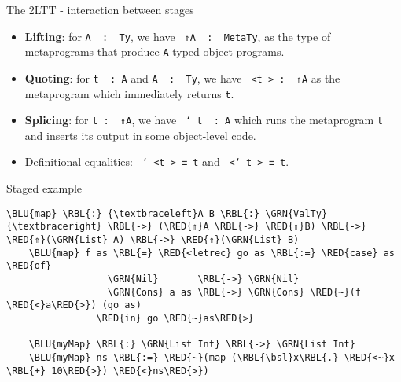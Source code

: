 \documentclass[dvipsnames,aspectratio=169]{beamer}
\newcommand{\ttt}[1]{{\texttt{#1}}}
\theoremstyle{remark}
\newcommand{\RED}[1]{{\color{BrickRed} #1}}
\newcommand{\GRN}[1]{{\color{OliveGreen} #1}}
\newcommand{\RBL}[1]{{\color{RoyalBlue} #1}}
\newcommand{\BLU}[1]{{\color{Blue} #1}}
\newcommand{\bsl}{\textbackslash}
\begin{document}




\begin{frame}[fragile]{The 2LTT - interaction between stages}

\begin{itemize}
\item \textbf{Lifting}: for \ttt{A \RBL{:} \GRN{Ty}}, we have \ttt{\RED{⇑}A \RBL{:} \GRN{MetaTy}}, as the type of
      metaprograms that produce \ttt{A}-typed object programs.
\item \textbf{Quoting}: for \ttt{t \RBL{:} A} and \ttt{A \RBL{:} \GRN{Ty}}, we have \ttt{\RED{<}t\RED{>} : \RED{⇑}A} as the metaprogram
      which immediately returns \ttt{t}.
\item \textbf{Splicing}: for \ttt{t : \RED{⇑}A}, we have \ttt{\RED{\char`~}t \RBL{:} A} which runs the
       metaprogram \ttt{t} and inserts its output in some object-level code.
\item Definitional equalities: \ttt{\RED{\char`~<}t\RED{>} ≡ t} and \ttt{\RED{<\char`~}t\RED{>} ≡ t}.
\end{itemize}

\end{frame}

\begin{frame}[fragile]{Staged example}

\begin{Verbatim}[commandchars=\\\{\}]
    \BLU{map} \RBL{:} {\textbraceleft}A B \RBL{:} \GRN{ValTy}{\textbraceright} \RBL{->} (\RED{⇑}A \RBL{->} \RED{⇑}B) \RBL{->} \RED{⇑}(\GRN{List} A) \RBL{->} \RED{⇑}(\GRN{List} B)
    \BLU{map} f as \RBL{=} \RED{<letrec} go as \RBL{:=} \RED{case} as \RED{of}
                  \GRN{Nil}       \RBL{->} \GRN{Nil}
                  \GRN{Cons} a as \RBL{->} \GRN{Cons} \RED{~}(f \RED{<}a\RED{>}) (go as)
                \RED{in} go \RED{~}as\RED{>}

    \BLU{myMap} \RBL{:} \GRN{List Int} \RBL{->} \GRN{List Int}
    \BLU{myMap} ns \RBL{:=} \RED{~}(map (\RBL{\bsl}x\RBL{.} \RED{<~}x \RBL{+} 10\RED{>}) \RED{<}ns\RED{>})
\end{Verbatim}

\end{frame}
\end{document}

